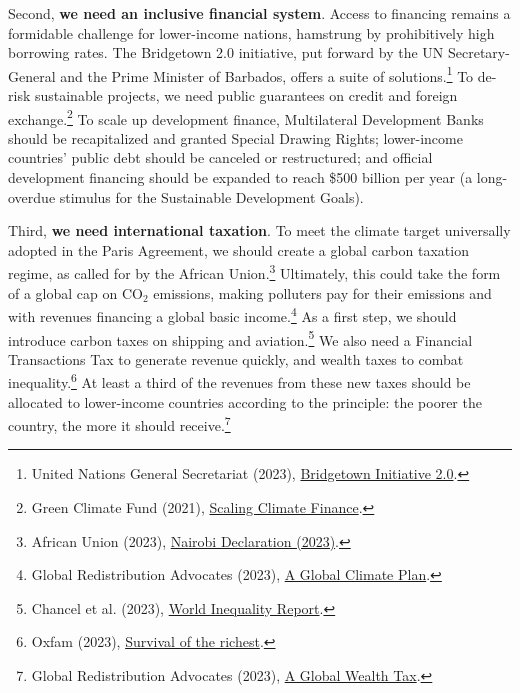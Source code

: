 \documentclass[a5paper,english,openany]{memoir}
\begin{document}
Second, \textbf{we need an inclusive financial system}. Access to financing remains a formidable challenge for lower-income nations, hamstrung by prohibitively high borrowing rates. The Bridgetown 2.0 initiative, put forward by the UN Secretary-General and the Prime Minister of Barbados, offers a suite of solutions.\footnote{United Nations General Secretariat (2023), \href{https://www.un.org/sustainabledevelopment/blog/2023/04/press-release-with-clock-ticking-for-the-sdgs-un-chief-and-barbados-prime-minister-call-for-urgent-action-to-transform-broken-global-financial-system/}{Bridgetown Initiative 2.0}.} %
To de-risk sustainable projects, we need public guarantees on credit and foreign exchange.\footnote{Green Climate Fund (2021), \href{https://www.greenclimate.fund/sites/default/files/document/scaling-climate-finance-context-covid-19-full-report\_0.pdf}{Scaling Climate Finance}.} 
To scale up development finance, Multilateral Development Banks should be recapitalized and granted Special Drawing Rights; lower-income countries' public debt should be canceled or restructured; and official development financing should be expanded to reach \$500 billion per year (a long-overdue stimulus for the Sustainable Development Goals). 

Third, \textbf{we need international taxation}. To meet the climate target universally adopted in the Paris Agreement, we should create a global carbon taxation regime, as called for by the African Union.\footnote{African Union (2023), \href{https://media.africaclimatesummit.org/NAIROBI+Declaration+FURTHER+edited+060923+EN+920AM.pdf}{Nairobi Declaration (2023)}.} 
Ultimately, this could take the form of a global cap on CO$_\text{2}$ emissions, making polluters pay for their emissions and with revenues financing a global basic income.\footnote{Global Redistribution Advocates (2023), \href{https://github.com/bixiou/global\_tax\_attitudes/raw/main/paper/policy\_brief\_GCS.pdf}{A Global Climate Plan}.} 
As a first step, we should introduce carbon taxes on shipping and aviation.\footnote{Chancel et al. (2023), \href{https://wid.world/wp-content/uploads/2023/01/CBV2023-ClimateInequalityReport-3.pdf}{World Inequality Report}.} 
We also need a Financial Transactions Tax to generate revenue quickly, and wealth taxes to combat inequality.\footnote{Oxfam (2023), \href{https://oxfamilibrary.openrepository.com/bitstream/handle/10546/621477/mn-survival-of-the-richest-methodology-160123-en.pdf}{Survival of the richest}.} 
At least a third of the revenues from these new taxes should be allocated to lower-income countries according to the principle: the poorer the country, the more it should receive.\footnote{Global Redistribution Advocates (2023), \href{https://github.com/bixiou/global\_tax\_attitudes/raw/main/paper/policy\_brief\_tax.pdf}{A Global Wealth Tax}.}
\end{document}
